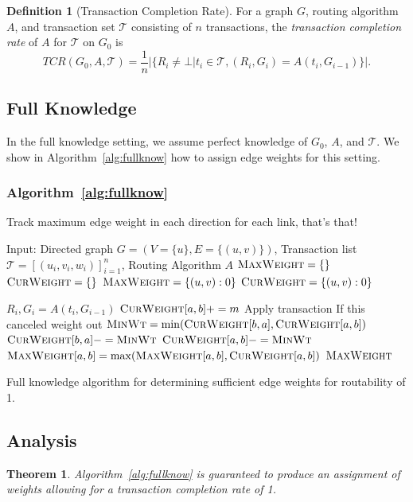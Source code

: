 \documentclass{article}
\newtheorem{theorem}{Theorem}
\theoremstyle{definition}
\newtheorem{definition}{Definition}[section]
\begin{document}
\begin{definition}[Transaction Completion Rate]
\label{def:transcomp}
For a graph $G$, routing algorithm $A$, and transaction set $\mathcal{T}$ consisting of $n$ transactions, the \emph{transaction completion rate} of $A$ for $\mathcal{T}$ on $G_0$ is
\[
TCR(G_0, A, \mathcal{T})=\frac{1}{n}|\lbrace R_i\neq\bot|t_i\in\mathcal{T}, (R_i,G_i)=A(t_i,G_{i-1})\rbrace|.
\]
\end{definition}

\subsection{Full Knowledge}
In the full knowledge setting, we assume perfect knowledge of $G_0$, $A$, and $\mathcal{T}$. We show in Algorithm~\ref{alg:fullknow} how to assign edge weights for this setting. 

\subsubsection{Algorithm~\ref{alg:fullknow}}
Track maximum edge weight in each direction for each link, that's that!

\begin{algorithm}[!htb]
\begin{algorithmic}
\State Input: Directed graph $G=(V=\lbrace u\rbrace, E=\lbrace (u, v)\rbrace)$, Transaction list $\mathcal{T}=[(u_i, v_i, w_i)]_{i=1}^n$, Routing Algorithm $A$
\State $\textsc{MaxWeight}=\lbrace\rbrace$
\State $\textsc{CurWeight}=\lbrace\rbrace$
\State $\textsc{MaxWeight} = \lbrace (u, v): 0\rbrace$
\State $\textsc{CurWeight} = \lbrace (u, v): 0\rbrace$
\EndFor

\State $R_i, G_i=A(t_i,G_{i-1})$
\State $\textsc{CurWeight}[a, b]+=m$ \Comment Apply transaction
 \Comment If this canceled weight out
\State $\textsc{MinWt}=\min(\textsc{CurWeight}[b, a], \textsc{CurWeight}[a, b])$
\State $\textsc{CurWeight}[b, a]-=\textsc{MinWt}$
\State $\textsc{CurWeight}[a, b]-=\textsc{MinWt}$
\EndIf
\State $\textsc{MaxWeight}[a, b]=\max(\textsc{MaxWeight}[a, b], \textsc{CurWeight}[a, b])$
\EndFor
\EndFor
\State \Return $\textsc{MaxWeight}$
\end{algorithmic}
\caption{Full knowledge algorithm for determining sufficient edge weights for routability of 1.}
\label{alg:fullknow}
\end{algorithm}
\subsection{Analysis}
\begin{theorem}
  \label{theorem:perfectassignment}
Algorithm~\ref{alg:fullknow} is guaranteed to produce an assignment of weights allowing for a transaction completion rate of 1.
\end{theorem}
\end{document}
